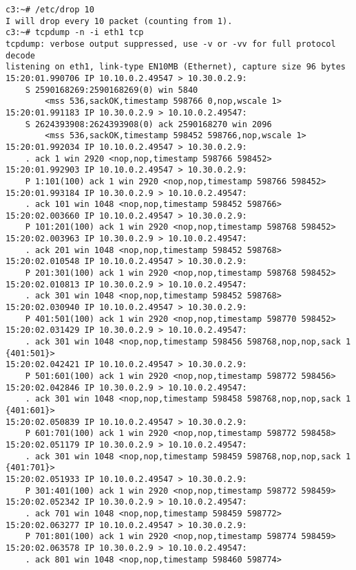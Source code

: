 \documentclass[a4paper,12pt]{article}
\begin{document}
\begin{Verbatim}
c3:~# /etc/drop 10          
I will drop every 10 packet (counting from 1).
c3:~# tcpdump -n -i eth1 tcp
tcpdump: verbose output suppressed, use -v or -vv for full protocol decode
listening on eth1, link-type EN10MB (Ethernet), capture size 96 bytes
15:20:01.990706 IP 10.10.0.2.49547 > 10.30.0.2.9: 
    S 2590168269:2590168269(0) win 5840 
        <mss 536,sackOK,timestamp 598766 0,nop,wscale 1>
15:20:01.991183 IP 10.30.0.2.9 > 10.10.0.2.49547: 
    S 2624393908:2624393908(0) ack 2590168270 win 2096 
        <mss 536,sackOK,timestamp 598452 598766,nop,wscale 1>
15:20:01.992034 IP 10.10.0.2.49547 > 10.30.0.2.9: 
    . ack 1 win 2920 <nop,nop,timestamp 598766 598452>
15:20:01.992903 IP 10.10.0.2.49547 > 10.30.0.2.9: 
    P 1:101(100) ack 1 win 2920 <nop,nop,timestamp 598766 598452>
15:20:01.993184 IP 10.30.0.2.9 > 10.10.0.2.49547: 
    . ack 101 win 1048 <nop,nop,timestamp 598452 598766>
15:20:02.003660 IP 10.10.0.2.49547 > 10.30.0.2.9: 
    P 101:201(100) ack 1 win 2920 <nop,nop,timestamp 598768 598452>
15:20:02.003963 IP 10.30.0.2.9 > 10.10.0.2.49547: 
    . ack 201 win 1048 <nop,nop,timestamp 598452 598768>
15:20:02.010548 IP 10.10.0.2.49547 > 10.30.0.2.9: 
    P 201:301(100) ack 1 win 2920 <nop,nop,timestamp 598768 598452>
15:20:02.010813 IP 10.30.0.2.9 > 10.10.0.2.49547: 
    . ack 301 win 1048 <nop,nop,timestamp 598452 598768>
15:20:02.030940 IP 10.10.0.2.49547 > 10.30.0.2.9: 
    P 401:501(100) ack 1 win 2920 <nop,nop,timestamp 598770 598452>
15:20:02.031429 IP 10.30.0.2.9 > 10.10.0.2.49547: 
    . ack 301 win 1048 <nop,nop,timestamp 598456 598768,nop,nop,sack 1 {401:501}>
15:20:02.042421 IP 10.10.0.2.49547 > 10.30.0.2.9: 
    P 501:601(100) ack 1 win 2920 <nop,nop,timestamp 598772 598456>
15:20:02.042846 IP 10.30.0.2.9 > 10.10.0.2.49547: 
    . ack 301 win 1048 <nop,nop,timestamp 598458 598768,nop,nop,sack 1 {401:601}>
15:20:02.050839 IP 10.10.0.2.49547 > 10.30.0.2.9: 
    P 601:701(100) ack 1 win 2920 <nop,nop,timestamp 598772 598458>
15:20:02.051179 IP 10.30.0.2.9 > 10.10.0.2.49547: 
    . ack 301 win 1048 <nop,nop,timestamp 598459 598768,nop,nop,sack 1 {401:701}>
15:20:02.051933 IP 10.10.0.2.49547 > 10.30.0.2.9: 
    P 301:401(100) ack 1 win 2920 <nop,nop,timestamp 598772 598459>
15:20:02.052342 IP 10.30.0.2.9 > 10.10.0.2.49547: 
    . ack 701 win 1048 <nop,nop,timestamp 598459 598772>
15:20:02.063277 IP 10.10.0.2.49547 > 10.30.0.2.9: 
    P 701:801(100) ack 1 win 2920 <nop,nop,timestamp 598774 598459>
15:20:02.063578 IP 10.30.0.2.9 > 10.10.0.2.49547: 
    . ack 801 win 1048 <nop,nop,timestamp 598460 598774>

\end{Verbatim}
\end{document}
